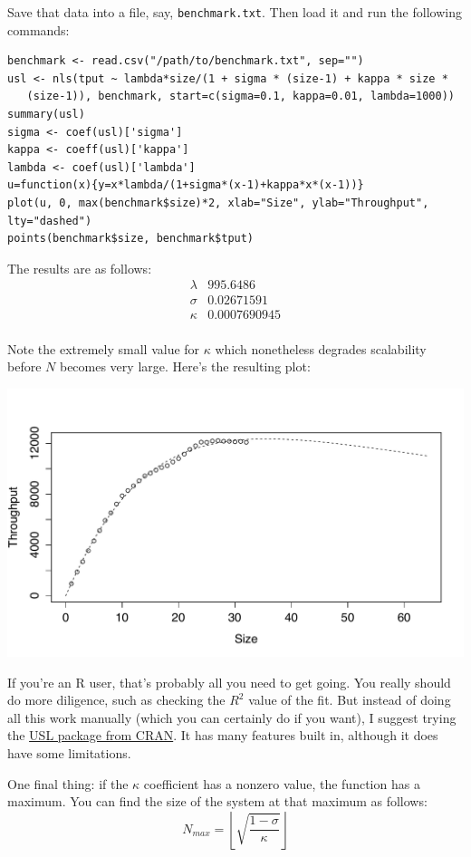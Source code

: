 \documentclass{vivid_layout}
\begin{document}
Save that data into a file, say, \texttt{benchmark.txt}. Then load it and run the following commands:

\begin{verbatim}
benchmark <- read.csv("/path/to/benchmark.txt", sep="")
usl <- nls(tput ~ lambda*size/(1 + sigma * (size-1) + kappa * size *
   (size-1)), benchmark, start=c(sigma=0.1, kappa=0.01, lambda=1000))
summary(usl)
sigma <- coef(usl)['sigma']
kappa <- coeff(usl)['kappa']
lambda <- coef(usl)['lambda']
u=function(x){y=x*lambda/(1+sigma*(x-1)+kappa*x*(x-1))}
plot(u, 0, max(benchmark$size)*2, xlab="Size", ylab="Throughput", lty="dashed")
points(benchmark$size, benchmark$tput)
\end{verbatim}

The results are as follows:
\[
\begin{array}{ll}
			\lambda&995.6486 \\
     \sigma & 0.02671591 \\
			       \kappa & 0.0007690945 \\
\end{array}
\]

Note the extremely small value for $\kappa$ which nonetheless degrades
scalability before $N$ becomes very large. Here's the resulting plot:
\begin{center}
\includegraphics[width=.85\linewidth]{scalability/cisco}
\end{center}

If you're an R user, that's probably all you need to get going. You really
should do more diligence, such as checking the $R^2$ value of the fit. But
instead of doing all this work manually (which you can certainly do if you
want), I suggest trying the
\href{https://cran.r-project.org/web/packages/usl/}{USL package from CRAN}. It
has many features built in, although it does have some limitations.

One final thing: if the $\kappa$ coefficient has a nonzero value, the function
has a maximum. You can find the size of the system at that maximum as follows:
\[
N_{max} = \left \lfloor \sqrt{\frac{1-\sigma}{\kappa}} \right \rfloor
\]
\end{document}
